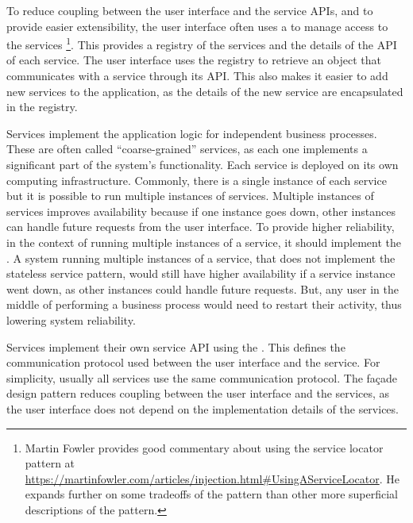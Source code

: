 To reduce coupling between the user interface and the service APIs, and to provide easier extensibility, the user interface often uses a
 to manage access to the services%
\footnote{Martin Fowler provides good commentary about using the service locator pattern at \url{https://martinfowler.com/articles/injection.html\#UsingAServiceLocator}.
He expands further on some tradeoffs of the pattern than other more superficial descriptions of the pattern.}.
This provides a registry of the services and the details of the API of each service.
The user interface uses the registry to retrieve an object that communicates with a service through its API.
This also makes it easier to add new services to the application, as the details of the new service are encapsulated in the registry.

Services implement the application logic for independent business processes.
These are often called ``coarse-grained'' services, as each one implements a significant part of the system's functionality.
Each service is deployed on its own computing infrastructure.
Commonly, there is a single instance of each service but it is possible to run multiple instances of services.
Multiple instances of services improves availability because if one instance goes down, other instances can handle future requests from the user interface.
To provide higher reliability, in the context of running multiple instances of a service, it should implement the
.
A system running multiple instances of a service, that does not implement the stateless service pattern,
would still have higher availability if a service instance went down, as other instances could handle future requests.
But, any user in the middle of performing a business process would need to restart their activity, thus lowering system reliability.

Services implement their own service API using the .
This defines the communication protocol used between the user interface and the service.
For simplicity, usually all services use the same communication protocol.
The façade design pattern reduces coupling between the user interface and the services,
as the user interface does not depend on the implementation details of the services.

